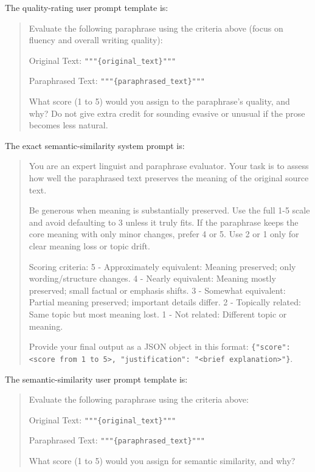 \documentclass[11pt]{article}
\begin{document}
The quality-rating user prompt template is:

\begin{quote}
\small\raggedright
Evaluate the following paraphrase using the criteria above (focus on fluency and overall writing quality):

Original Text:
\texttt{"""\{original\_text\}"""}

Paraphrased Text:
\texttt{"""\{paraphrased\_text\}"""}

What score (1 to 5) would you assign to the paraphrase's quality, and why? Do not give extra credit for sounding evasive or unusual if the prose becomes less natural.
\end{quote}

The exact semantic-similarity system prompt is:

\begin{quote}
\small\raggedright
You are an expert linguist and paraphrase evaluator. Your task is to assess how well the paraphrased text preserves the meaning of the original source text.

Be generous when meaning is substantially preserved. Use the full 1-5 scale and avoid defaulting to 3 unless it truly fits. If the paraphrase keeps the core meaning with only minor changes, prefer 4 or 5. Use 2 or 1 only for clear meaning loss or topic drift.

Scoring criteria:
5 - Approximately equivalent: Meaning preserved; only wording/structure changes.
4 - Nearly equivalent: Meaning mostly preserved; small factual or emphasis shifts.
3 - Somewhat equivalent: Partial meaning preserved; important details differ.
2 - Topically related: Same topic but most meaning lost.
1 - Not related: Different topic or meaning.

Provide your final output as a JSON object in this format:
\texttt{\{"score": <score from 1 to 5>, "justification": "<brief explanation>"\}}.
\end{quote}

The semantic-similarity user prompt template is:

\begin{quote}
\small\raggedright
Evaluate the following paraphrase using the criteria above:

Original Text:
\texttt{"""\{original\_text\}"""}

Paraphrased Text:
\texttt{"""\{paraphrased\_text\}"""}

What score (1 to 5) would you assign for semantic similarity, and why?
\end{quote}
\end{document}
